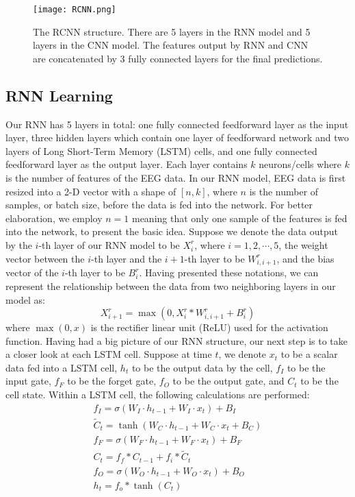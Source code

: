 \begin{figure*}[t]
        \centering
        \texttt{[image: RCNN.png]}
        \caption{The RCNN structure. There are 5 layers in the RNN model and 5 layers in the CNN model. The features output by RNN and CNN are concatenated by 3 fully connected layers for the final predictions.}
        \label{fig:rcnn}
\end{figure*}

\subsection{RNN Learning}
Our RNN has 5 layers in total: one fully connected feedforward layer as the input layer, three hidden layers which contain one layer of feedforward network and two layers of Long Short-Term Memory (LSTM) cells, and one fully connected feedforward layer as the output layer. Each layer contains $k$ neurons/cells where $k$ is the number of features of the EEG data. In our RNN model, EEG data is first resized into a 2-D vector with a shape of $[n,k]$, where $n$ is the number of samples, or batch size, before the data is fed into the network. For better elaboration, we employ $n=1$ meaning that only one sample of the features is fed into the network, to present the basic idea. Suppose we denote the data output by the $i$-th layer of our RNN model to be $X_i^{r}$, where $i=1,2,\cdots,5$, the weight vector between the $i$-th layer and the $i+1$-th layer to be $W_{i,i+1}^{r}$, and the bias vector of the $i$-th layer to be $B_{i}^{r}$. Having presented these notations, we can represent the relationship between the data from two neighboring layers in our model as:
\begin{equation}
X_{i+1}^{r} = \max(0, X_i^{r}* W_{i,i+1}^{r} + B_{i}^{r})
\end{equation} 
where $\max(0,x)$ is the rectifier linear unit (ReLU) used for the activation function. Having had a big picture of our RNN structure, our next step is to take a closer look at each LSTM cell. Suppose at time $t$, we denote $x_{t}$ to be a scalar data fed into a LSTM cell, $h_{t}$ to be the output data by the cell, $f_{I}$ to be the input gate, $f_F$ to be the forget gate, $f_O$ to be the output gate, and $C_{t}$ to be the cell state. Within a LSTM cell, the following calculations are performed:
\begin{gather}
f_{I} = \sigma (W_{I}\cdot h_{t-1} + W_{I} \cdot x_{t}) + B_{I}\\
\widetilde{C}_{t} = \tanh(W_{C}\cdot h_{t-1} + W_{C} \cdot x_{t} + B_{C})\\
f_{F} = \sigma (W_{F}\cdot h_{t-1} + W_{F} \cdot x_{t}) + B_{F}\\
C_{t} = f_{f} * C_{t-1} + f_{i} * \widetilde{C}_{t}\\
f_{O} = \sigma (W_{O}\cdot h_{t-1} + W_{O} \cdot x_{t}) + B_{O}\\
h_{t} = f_{o} * \tanh(C_{t})
\end{gather} 
